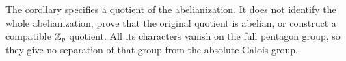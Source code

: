 \begin{remark}
The corollary specifies a quotient of the abelianization.  It does not
identify the whole abelianization, prove that the original quotient is
abelian, or construct a compatible $\mathbb Z_p$ quotient.  All its characters
vanish on the full pentagon group, so they give no separation of that
group from the absolute Galois group.
\end{remark}
